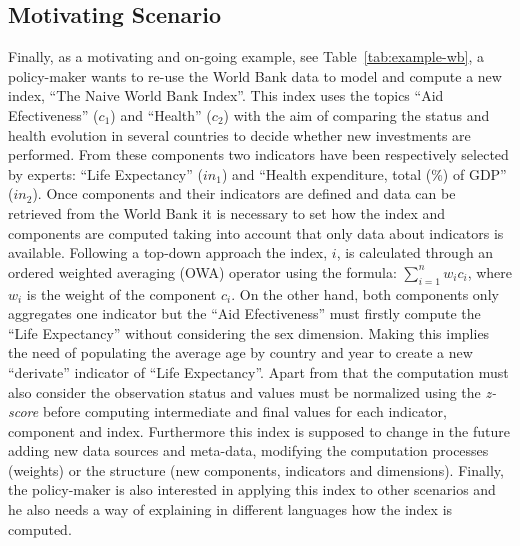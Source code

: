 \subsection{Motivating Scenario}
Finally, as a motivating and on-going example, see Table~\ref{tab:example-wb}, a policy-maker wants to re-use the World Bank data to model and compute a new index, ``The Naive World Bank Index''. This 
index uses the topics ``Aid Efectiveness'' ($c_1$) and ``Health'' ($c_2$) with the aim of comparing the status and health evolution in several countries to decide whether new 
investments are performed. From these components two indicators have been respectively selected by experts: ``Life Expectancy'' ($in_1$) and ``Health expenditure, total (\%) of GDP'' ($in_2$). 
Once components and their indicators are defined and data can be retrieved from the World Bank it is necessary to set how the index and components are computed 
taking into account that only data about indicators is available. Following a top-down approach the index, $i$, is calculated through an ordered weighted averaging (OWA) operator using the 
formula: $\sum_{i=1}^n  w_i c_i$, where $w_i$ is the weight of the component $c_i$. On the other hand, both components only aggregates one indicator but the ``Aid Efectiveness'' 
must firstly compute the ``Life Expectancy'' without considering the sex dimension. Making this implies the need of populating the average age by country and year to create 
a new ``derivate'' indicator of ``Life Expectancy''. Apart from that the computation must also consider the observation status and values must be normalized using the 
\textit{z-score} before computing intermediate and final values for each indicator, component and index. Furthermore this index is supposed to change in the future 
adding new data sources and meta-data, modifying the computation processes (weights) or the structure (new components, indicators and dimensions). Finally, the policy-maker 
is also interested in applying this index to other scenarios and he also needs a way of explaining in different languages how the index is computed. 


